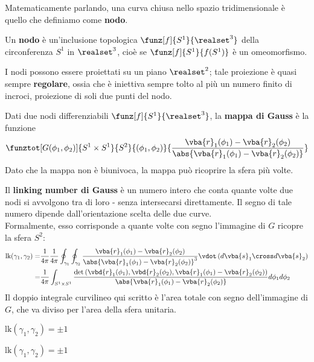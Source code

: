 Matematicamente parlando, una curva chiusa nello spazio tridimensionale è quello che definiamo come \textbf{nodo}.
\begin{define}[Nodo]
	Un \textbf{nodo} è un'inclusione topologica $\funz[f]{S^1}{\realset^3}$ della circonferenza $S^1$ in $\realset^3$, cioè se $\funz[f]{S^1}{f(S^1)}$ è un omeomorfismo.
\end{define}
I nodi possono essere proiettati su un piano $\realset^2$; tale proiezione è quasi sempre \textbf{regolare}, ossia che è iniettiva sempre tolto al più un numero finito di incroci, proiezione di soli due punti del nodo.
\begin{define}
	Dati due nodi differenziabili $\funz[f]{S^1}{\realset^3}$, la \textbf{mappa di Gauss} è la funzione
	\begin{equation}
		\funztot[G(\phi_1,\phi_2)]{S^1\times S^1}{S^2}{\left(\phi_1,\phi_2\right)}{\frac{\vba{r}_1(\phi_1) - \vba{r}_2 (\phi_2)}{\abs{\vba{r}_1(\phi_1) - \vba{r}_2(\phi_2)}}}
	\end{equation}
	Dato che la mappa non è biunivoca, la mappa può ricoprire la sfera più volte.
\end{define}
\begin{define}
	Il \textbf{linking number di Gauss} è un numero intero che conta quante volte due nodi si avvolgono tra di loro - senza intersecarsi direttamente. Il segno di tale numero dipende dall'orientazione scelta delle due curve.\\
	Formalmente, esso corrisponde a quante volte con segno l'immagine di $G$ ricopre la sfera $S^2$:
	\begin{align}
		\textrm{lk}(\gamma_1,\gamma_2)=&\frac{1}{4\pi}\frac{1}{4\pi}\oint_{\gamma_1} \oint_{\gamma_2} \frac{\vba{r}_1(\phi_1) - \vba{r}_2 (\phi_2)}{\abs{\vba{r}_1(\phi_1) - \vba{r}_2(\phi_2)}^3} \vdot \left(d\vba{s}_1\cross d\vba{s}_2\right)\\
		=&\frac{1}{4\pi}\int_{S^1\times S^1}\frac{\det\left(\vbd{r}_1(\phi_1),\vbd{r}_2(\phi_2),\vba{r}_1(\phi_1)-\vba{r}_2(\phi_2)\right)}{\abs{\vba{r}_1(\phi_1) - \vba{r}_2(\phi_2)}}d\phi_1d\phi_2
	\end{align}
	Il doppio integrale curvilineo qui scritto è l'area totale con segno dell'immagine di $G$, che va diviso per l'area della sfera unitaria.
\end{define}
\begin{example}
	\item $\textrm{lk}(\gamma_1,\gamma_2)=\pm 1$ %
	\item $\textrm{lk}(\gamma_1,\gamma_2)=\pm 1$ %
\end{example}
